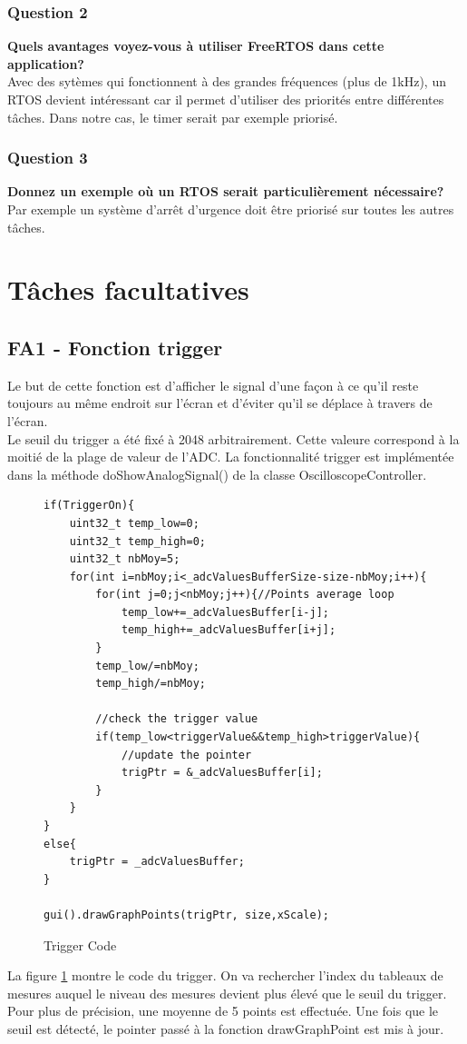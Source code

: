 \documentclass[12pt]{article}
\begin{document}
	\subsubsection{Question 2}
	\textbf{Quels avantages voyez-vous à utiliser FreeRTOS dans cette application?}\\
	Avec des sytèmes qui fonctionnent à des grandes fréquences (plus de 1kHz), un RTOS devient intéressant car il permet d'utiliser des priorités entre différentes tâches. Dans notre cas, le timer serait par exemple priorisé.
	\subsubsection{Question 3}
	\textbf{Donnez un exemple où un RTOS serait particulièrement nécessaire?}\\
	Par exemple un système d'arrêt d'urgence doit être priorisé sur toutes les autres tâches.
	\section{Tâches facultatives}
	\subsection{FA1 - Fonction trigger}
	Le but de cette fonction est d'afficher le signal d'une façon à ce qu'il reste toujours au même endroit sur l'écran et d’éviter qu’il se déplace à travers de l'écran.\\
	Le seuil du trigger a été fixé à 2048 arbitrairement. Cette valeure correspond à la moitié de la plage de valeur de l'ADC. La fonctionnalité trigger est implémentée dans la méthode doShowAnalogSignal() de la classe OscilloscopeController.\\
	
		\begin{figure}[H]
		\begin{lstlisting}
if(TriggerOn){
	uint32_t temp_low=0;
	uint32_t temp_high=0;
	uint32_t nbMoy=5;
	for(int i=nbMoy;i<_adcValuesBufferSize-size-nbMoy;i++){
		for(int j=0;j<nbMoy;j++){//Points average loop
			temp_low+=_adcValuesBuffer[i-j];
			temp_high+=_adcValuesBuffer[i+j];
		}
		temp_low/=nbMoy;
		temp_high/=nbMoy;
	
		//check the trigger value
		if(temp_low<triggerValue&&temp_high>triggerValue){
			//update the pointer
			trigPtr = &_adcValuesBuffer[i];
		}
	}
}
else{
	trigPtr = _adcValuesBuffer;
}

gui().drawGraphPoints(trigPtr, size,xScale);
		\end{lstlisting}
		\caption{Trigger Code}
		\label{code_trig}
	\end{figure}
La figure \ref{code_trig} montre le code du trigger. On va rechercher l'index du tableaux de mesures auquel le niveau des mesures devient plus élevé que le seuil du trigger. Pour plus de précision, une moyenne de 5 points est effectuée. Une fois que le seuil est détecté, le pointer passé à la fonction drawGraphPoint est mis à jour.	
\end{document}
